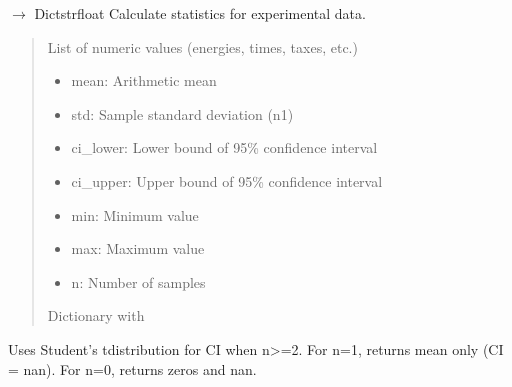\documentclass[letterpaper,10pt,english]{sphinxmanual}
\begin{document}
\begin{fulllineitems}
\label{\detokenize{core.execution.base:core.execution.base.calc_stats}}
\pysigstartsignatures
\pysiglinewithargsret
{}
{}
{{ $\rightarrow$ Dict\DUrole{p}{{[}}strfloat\DUrole{p}{{]}}}}
\pysigstopsignatures
\sphinxAtStartPar
Calculate statistics for experimental data.
\begin{quote}\begin{description}
\sphinxAtStartPar
{} \textendash{} List of numeric values (energies, times, taxes, etc.)

\sphinxAtStartPar
\begin{itemize}
\item {} 
\sphinxAtStartPar
mean: Arithmetic mean

\item {} 
\sphinxAtStartPar
std: Sample standard deviation (n\sphinxhyphen{}1)

\item {} 
\sphinxAtStartPar
ci\_lower: Lower bound of 95\% confidence interval

\item {} 
\sphinxAtStartPar
ci\_upper: Upper bound of 95\% confidence interval

\item {} 
\sphinxAtStartPar
min: Minimum value

\item {} 
\sphinxAtStartPar
max: Maximum value

\item {} 
\sphinxAtStartPar
n: Number of samples

\end{itemize}


\sphinxAtStartPar
Dictionary with

\end{description}\end{quote}
\begin{description}
\sphinxAtStartPar
Uses Student’s t\sphinxhyphen{}distribution for CI when n\textgreater{}=2.
For n=1, returns mean only (CI = nan).
For n=0, returns zeros and nan.

\end{description}

\end{fulllineitems}
\end{document}
